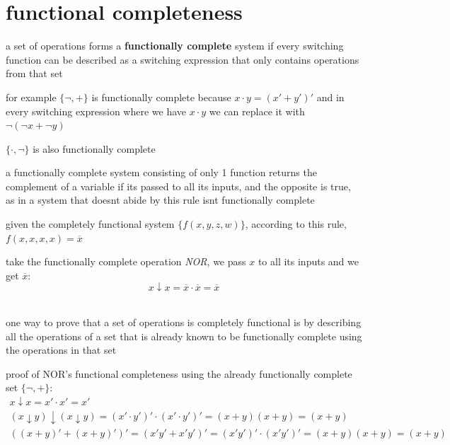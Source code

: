 \documentclass[a4paper,12pt]{article}
\begin{document}
\section{functional completeness}
\label{sec:orgd41edb1}
\begin{definition}
a set of operations forms a \textbf{functionally complete} system if every switching function can be described as a switching expression that only contains operations from that set\\
\begin{my_example}
for example \(\{\lnot, +\}\) is functionally complete because \(x \cdot y = (x'+y')'\) and in every switching expression where we have \(x \cdot y\) we can replace it with \(\lnot(\lnot x + \lnot y)\)\\
\end{my_example}
\begin{my_example}
\(\{\cdot, \lnot\}\) is also functionally complete\\
\end{my_example}
\begin{lemma}
a functionally complete system consisting of only 1 function returns the complement of a variable if its passed to all its inputs, and the opposite is true, as in a system that doesnt abide by this rule isnt functionally complete\\
\begin{my_example}
given the completely functional system \(\{f(x,y,z,w)\}\), according to this rule, \(f(x,x,x,x) = \overline{x}\)\\
\end{my_example}
\begin{my_example}
take the functionally complete operation \emph{NOR}, we pass \(x\) to all its inputs and we get \(\overline{x}\):\\
\[ x \downarrow x = \overline{x} \cdot \overline{x} = \overline{x} \]\\
\end{my_example}
\end{lemma}
\begin{lemma}
one way to prove that a set of operations is completely functional is by describing all the operations of a set that is already known to be functionally complete using the operations in that set\\
\begin{my_example}
proof of NOR's functional completeness using the already functionally complete set \(\{\lnot, +\}\):\\
\begin{gather*}
  x \downarrow x = x' \cdot x' = x'\\
  (x \downarrow y) \downarrow (x \downarrow y) = (x' \cdot y')' \cdot (x' \cdot y')' = (x + y)(x + y) = (x + y)\\
  ((x + y)' + (x + y)')' = (x'y' + x'y')' = (x'y')' \cdot (x'y')' = (x+y)(x+y) = (x+y)
\end{gather*}
\end{my_example}
\end{lemma}
\end{definition}
\end{document}
